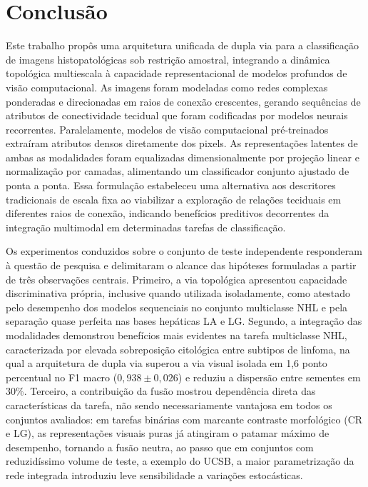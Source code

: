 \chapter{Conclusão}
\label{chap:conclusao}

Este trabalho propôs uma arquitetura unificada de dupla via para a classificação de imagens histopatológicas sob restrição amostral, integrando a dinâmica topológica multiescala à capacidade representacional de modelos profundos de visão computacional. As imagens foram modeladas como redes complexas ponderadas e direcionadas em raios de conexão crescentes, gerando sequências de atributos de conectividade tecidual que foram codificadas por modelos neurais recorrentes. Paralelamente, modelos de visão computacional pré-treinados extraíram atributos densos diretamente dos pixels. As representações latentes de ambas as modalidades foram equalizadas dimensionalmente por projeção linear e normalização por camadas, alimentando um classificador conjunto ajustado de ponta a ponta. Essa formulação estabeleceu uma alternativa aos descritores tradicionais de escala fixa ao viabilizar a exploração de relações teciduais em diferentes raios de conexão, indicando benefícios preditivos decorrentes da integração multimodal em determinadas tarefas de classificação.

Os experimentos conduzidos sobre o conjunto de teste independente responderam à questão de pesquisa e delimitaram o alcance das hipóteses formuladas a partir de três observações centrais. Primeiro, a via topológica apresentou capacidade discriminativa própria, inclusive quando utilizada isoladamente, como atestado pelo desempenho dos modelos sequenciais no conjunto multiclasse NHL e pela separação quase perfeita nas bases hepáticas LA e LG. Segundo, a integração das modalidades demonstrou benefícios mais evidentes na tarefa multiclasse NHL, caracterizada por elevada sobreposição citológica entre subtipos de linfoma, na qual a arquitetura de dupla via superou a via visual isolada em 1,6 ponto percentual no F1 macro ($0{,}938 \pm 0{,}026$) e reduziu a dispersão entre sementes em 30\%. Terceiro, a contribuição da fusão mostrou dependência direta das características da tarefa, não sendo necessariamente vantajosa em todos os conjuntos avaliados: em tarefas binárias com marcante contraste morfológico (CR e LG), as representações visuais puras já atingiram o patamar máximo de desempenho, tornando a fusão neutra, ao passo que em conjuntos com reduzidíssimo volume de teste, a exemplo do UCSB, a maior parametrização da rede integrada introduziu leve sensibilidade a variações estocásticas.

